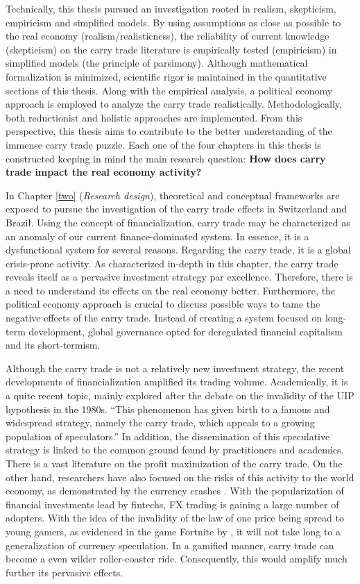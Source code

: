 \documentclass[a4paper, twoside]{templates/ociamthesis}
\begin{document}
Technically, this thesis pursued an investigation rooted in realism, skepticism, empiricism and simplified models. By using assumptions as close as possible to the real economy (realism/realisticness), the reliability of current knowledge (skepticism) on the carry trade literature is empirically tested (empiricism) in simplified models (the principle of parsimony). Although mathematical formalization is minimized, scientific rigor is maintained in the quantitative sections of this thesis. Along with the empirical analysis, a political economy approach is employed to analyze the carry trade realistically. Methodologically, both reductionist and holistic approaches are implemented. From this perspective, this thesis aims to contribute to the better understanding of the immense carry trade puzzle. Each one of the four chapters in this thesis is constructed keeping in mind the main research question: \textbf{How does carry trade impact the real economy activity?}

In Chapter \ref{two} (\emph{Research design}), theoretical and conceptual frameworks are exposed to pursue the investigation of the carry trade effects in Switzerland and Brazil. Using the concept of financialization, carry trade may be characterized as an anomaly of our current finance-dominated system. In essence, it is a dysfunctional system for several reasons. Regarding the carry trade, it is a global crisis-prone activity. As characterized in-depth in this chapter, the carry trade reveals itself as a pervasive investment strategy par excellence. Therefore, there is a need to understand its effects on the real economy better. Furthermore, the political economy approach is crucial to discuss possible ways to tame the negative effects of the carry trade. Instead of creating a system focused on long-term development, global governance opted for deregulated financial capitalism and its short-termism.

Although the carry trade is not a relatively new investment strategy, the recent developments of financialization amplified its trading volume. Academically, it is a quite recent topic, mainly explored after the debate on the invalidity of the UIP hypothesis in the 1980s. ``This phenomenon has given birth to a famous and widespread strategy, namely the carry trade, which appeals to a growing population of speculators.'' \autocite[ 185]{ames2017} In addition, the dissemination of this speculative strategy is linked to the common ground found by practitioners and academics. There is a vast literature on the profit maximization of the carry trade. On the other hand, researchers have also focused on the risks of this activity to the world economy, as demonstrated by the currency crashes \autocite[e.g.][]{brunnermeier2008}. With the popularization of financial investments lead by fintechs, FX trading is gaining a large number of adopters. With the idea of the invalidity of the law of one price being spread to young gamers, as evidenced in the game Fortnite by \textcite{stadtmann2020}, it will not take long to a generalization of currency speculation. In a gamified manner, carry trade can become a even wilder roller-coaster ride. Consequently, this would amplify much further its pervasive effects.
\end{document}

